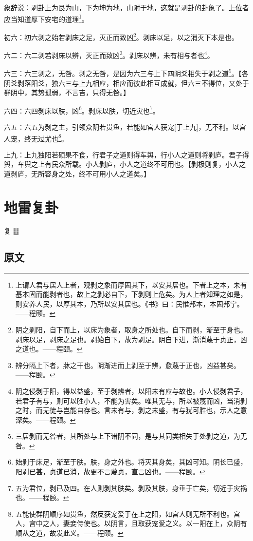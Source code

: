 \documentclass[12pt,oneside]{book}
\begin{document}
象辞说：剥卦上为艮为山，下为坤为地，山附于地，这就是剥卦的卦象了。上位者应当知道厚下安宅的道理\footnote{上谓人君与居人上者，观剥之象而厚固其下，以安其居也。下者上之本，未有基本固而能剥者也，故上之剥必自下，下剥则上危矣。为人上者知理之如是，则安养人民，以厚其本，乃所以安其居也。《书》曰：民惟邦本，本固邦宁。——程颐。}。


初六：初六剥之始若剥床之足，灭正而致凶\footnote{阴之剥阳，自下而上，以床为象者，取身之所处也。自下而剥，渐至于身也。剥床以足，剥床之足也。剥始自下，故为剥足。阴自下进，渐消蔑于贞正，凶之道也。——程颐。}。剥床以足，以之消灭下本是也。

六二：六二剥若剥床以辨，灭正而致凶\footnote{辨分隔上下者，牀之干也。阴渐进而上剥至于辨，愈蔑于正也，凶益甚矣。——程颐。}。剥床以辨，未有相与者也\footnote{阴之侵剥于阳，得以益盛，至于剥辨者，以阳未有应与故也。小人侵剥君子，若君子有与，则可以胜小人，不能为害矣。唯其无与，所以被蔑而凶，当消剥之时，而无徒与岂能自存也。言未有与，剥之未盛，有与犹可胜也，示人之意深矣。——程颐。}。

六三：六三剥之，无咎。剥之无咎，是因为六三与上下四阴爻相失于剥之道\footnote{三居剥而无咎者，其所处与上下诸阴不同，是与其同类相失于处剥之道，为无咎。}。【各阴爻剥落阳爻，独六三与上九相应，相应而彼此相互成就，但六三不得位，又处于群阴中，其势孤弱，不言吉，只得无咎。】

六四：六四剥床以肤，凶\footnote{始剥于床足，渐至于肤。肤，身之外也。将灭其身矣，其凶可知。阴长已盛，阳剥已甚，贞道已消，故更不言蔑贞，直言凶也。——程颐。}。剥床以肤，切近灾也\footnote{五为君位，剥已及四。在人则剥其肤矣。剥及其肤，身垂于亡矣，切近于灾祸也。——程颐。}。

六五：六五为剥之主，引领众阴若贯鱼，若能如宫人获宠[于上九]，无不利。以宫人宠，终无过尤也\footnote{五能使群阴顺序如贯鱼，然反获宠爱于在上之阳，如宫人则无所不利也。宫人，宫中之人，妻妾侍使也。以阴言，且取获宠爱之义。以一阳在上，众阴有顺从之道，故发此义。——程颐。}。

上九：上九独阳若硕果不食，行君子之道则得车舆，行小人之道则将剥庐。君子得舆，车舆之上有民众所载。小人剥庐，小人之道终不可用也。【剥极则复，小人之道剥庐，无所容身之处，终不可用小人之道矣。】


\chapter{地雷复卦}
复 {\Large ䷗}

\section{原文}
\end{document}
